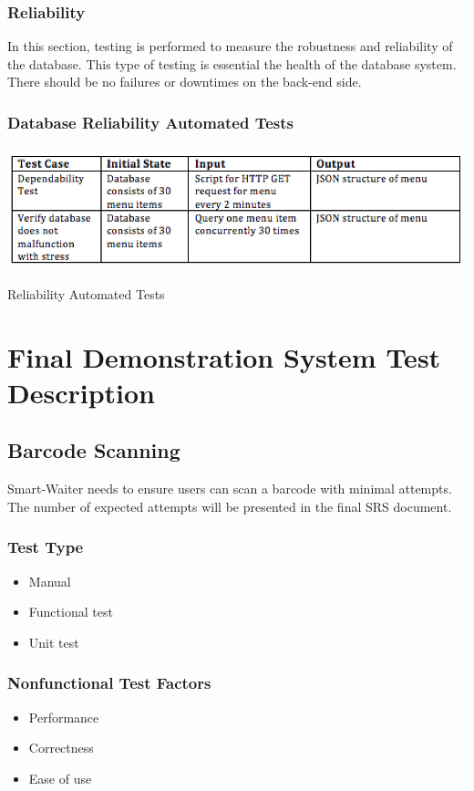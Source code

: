 \documentclass[12pt]{article}
\begin{document}
\subsubsection{Reliability}
In this section, testing is performed to measure the robustness and reliability of the database.  This type of testing is essential the health of the database system. There should be no failures or downtimes on the back-end side. 
\subsubsection{Database Reliability Automated Tests }
\pagebreak
\begin{table}[h]
\includegraphics[width=\textwidth,height=\textheight,keepaspectratio]{reliability_tests.png}
  \caption{Reliability Automated Tests}
\end{table}

\section{Final Demonstration System Test Description}

\subsection{Barcode Scanning}
Smart-Waiter needs to ensure users can scan a barcode with minimal attempts. The number of expected attempts will be presented in the final SRS document.

\subsubsection{Test Type}
\begin{itemize}
  \item Manual
  \item Functional test
  \item Unit test
\end{itemize}

\subsubsection{Nonfunctional Test Factors}
\begin{itemize}
  \item Performance
  \item 	Correctness
  \item 	Ease of use
\end{itemize}
\end{document}
